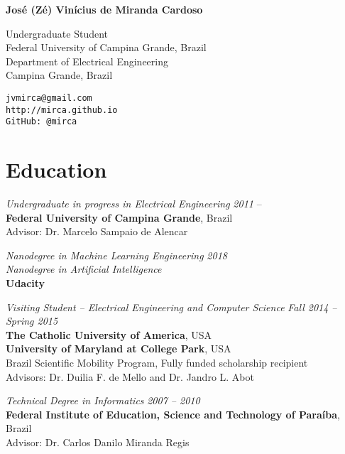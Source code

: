 \documentclass[10pt]{article}
\begin{document}
\pagestyle{empty}
\begin{titlepage}
     {\Large{\textbf{Jos\'e (Z\'e) Vin\'icius de Miranda Cardoso}}}
     \vspace{.5cm}

    \begin{minipage}[b]{8cm}
     Undergraduate Student\\
     Federal University of Campina Grande, Brazil\\
     Department of Electrical Engineering\\
     Campina Grande, Brazil
    \end{minipage}
    \hfill
    \begin{minipage}[b]{4cm}
        \hfill \texttt{jvmirca@gmail.com}\\
        \texttt{http://mirca.github.io}\\
        \texttt{GitHub: @mirca}
    \end{minipage}


\section*{Education}

\emph{Undergraduate in progress in Electrical Engineering} \hfill \textit{2011} --\\
\textbf{Federal University of Campina Grande}, Brazil\\
Advisor: Dr. Marcelo Sampaio de Alencar
\vspace{.5cm}

\emph{Nanodegree in Machine Learning Engineering} \hfill \textit{2018}\\
\emph{Nanodegree in Artificial Intelligence}\\
\textbf{Udacity}
\vspace{.5cm}

\emph{Visiting Student -- Electrical Engineering and Computer Science} \hfill \textit{Fall 2014 -- Spring 2015} \\
\textbf{The Catholic University of America}, USA\\
\textbf{University of Maryland at College Park}, USA \\
Brazil Scientific Mobility Program, Fully funded scholarship recipient \\
Advisors: Dr. Duilia F. de Mello and Dr. Jandro L. Abot
\vspace{.5cm}

\emph{Technical Degree in Informatics} \hfill \textit{2007 -- 2010}\\
\textbf{Federal Institute of Education, Science and Technology of Para\'iba}, Brazil \\
Advisor: Dr. Carlos Danilo Miranda Regis


\end{titlepage}
\end{document}
